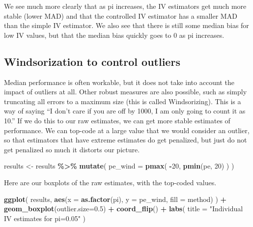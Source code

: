 \documentclass[
]{book}
\newenvironment{Shaded}{\begin{snugshade}}{\end{snugshade}}
\newcommand{\AttributeTok}[1]{\textcolor[rgb]{0.13,0.29,0.53}{#1}}
\newcommand{\DecValTok}[1]{\textcolor[rgb]{0.00,0.00,0.81}{#1}}
\newcommand{\FloatTok}[1]{\textcolor[rgb]{0.00,0.00,0.81}{#1}}
\newcommand{\FunctionTok}[1]{\textcolor[rgb]{0.13,0.29,0.53}{\textbf{#1}}}
\newcommand{\NormalTok}[1]{#1}
\newcommand{\OtherTok}[1]{\textcolor[rgb]{0.56,0.35,0.01}{#1}}
\newcommand{\SpecialCharTok}[1]{\textcolor[rgb]{0.81,0.36,0.00}{\textbf{#1}}}
\newcommand{\StringTok}[1]{\textcolor[rgb]{0.31,0.60,0.02}{#1}}
\begin{document}
We see much more clearly that as pi increases, the IV estimators get much more stable (lower MAD) and that the controlled IV estimator has a smaller MAD than the simple IV estimator.
We also see that there is still some median bias for low IV values, but that the median bias quickly goes to 0 as pi increases.

\subsection{Windsorization to control outliers}\label{windsorization-to-control-outliers}

Median performance is often workable, but it does not take into account the impact of outliers at all.
Other robust measures are also possible, such as simply truncating all errors to a maximum size (this is called Windsorizing).
This is a way of saying ``I don't care if you are off by 1000, I am only going to count it as 10.''
If we do this to our raw estimates, we can get more stable estimates of performance.
We can top-code at a large value that we would consider an outlier, so that estimators that have extreme estimates do get penalized, but just do not get penalized so much it distorts our picture.

\begin{Shaded}
\begin{Highlighting}[]
\NormalTok{results }\OtherTok{\textless{}{-}}\NormalTok{ results }\SpecialCharTok{\%\textgreater{}\%}
  \FunctionTok{mutate}\NormalTok{( }\AttributeTok{pe\_wind =} \FunctionTok{pmax}\NormalTok{( }\SpecialCharTok{{-}}\DecValTok{20}\NormalTok{, }\FunctionTok{pmin}\NormalTok{(pe, }\DecValTok{20}\NormalTok{) ) )}
\end{Highlighting}
\end{Shaded}

Here are our boxplots of the raw estimates, with the top-coded values.

\begin{Shaded}
\begin{Highlighting}[]
\FunctionTok{ggplot}\NormalTok{( results,}
        \FunctionTok{aes}\NormalTok{(}\AttributeTok{x =} \FunctionTok{as.factor}\NormalTok{(pi), }\AttributeTok{y =}\NormalTok{ pe\_wind, }
             \AttributeTok{fill =}\NormalTok{ method) ) }\SpecialCharTok{+}
  \FunctionTok{geom\_boxplot}\NormalTok{(}\AttributeTok{outlier.size=}\FloatTok{0.5}\NormalTok{) }\SpecialCharTok{+}
  \FunctionTok{coord\_flip}\NormalTok{() }\SpecialCharTok{+}
  \FunctionTok{labs}\NormalTok{( }\AttributeTok{title =} \StringTok{"Individual IV estimates for pi=0.05"}\NormalTok{ )}
\end{Highlighting}
\end{Shaded}
\end{document}
